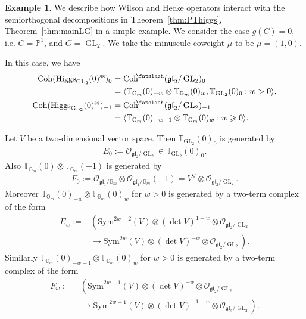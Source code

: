 \documentclass [11pt,oneside,a4paper,mathscr]{amsart}
\theoremstyle{definition}
\newtheorem{example}[thm]{Example}
\renewcommand{\geq}{\geqslant}
\newcommand{\Coh}{\operatorname{Coh}}
\newcommand{\GL}{\operatorname{GL}}
\newcommand{\shear}{{\mathbin{\mkern-6mu\fatslash}}}
\newcommand{\Hig}{\mathrm{Higgs}}
\begin{document}
\begin{example}\label{exam:Hecke}
We describe how Wilson and Hecke operators interact with the semiorthogonal decompositions in Theorem~\ref{thm:PThiggs}, Theorem~\ref{thm:mainLG} in a simple example. 
    We consider the case $g(C)=0$, i.e. $C=\mathbb{P}^1$, and $G=\GL_2$. 
    We take the minuscule coweight $\mu$ to be $\mu=(1, 0)$. 
    
    In this case, 
    we have 
\begin{align*}
    \Coh(\Hig_{\GL_2}(0)^{\mathrm{ss}})_0 &=\Coh^{\shear}(\mathfrak{gl}_2/\GL_2)_0 \\
    &=\langle \mathbb{T}_{\mathbb{G}_m}(0)_{-w}\otimes \mathbb{T}_{\mathbb{G}_m}(0)_w, \mathbb{T}_{\GL_2}(0)_0 : w>0\rangle, \\
    \Coh(\Hig_{\GL_2}(0)^{\mathrm{ss}})_{-1} &=\Coh^{\shear}(\mathfrak{gl}_2/\GL_2)_{-1} \\
    &=\langle \mathbb{T}_{\mathbb{G}_m}(0)_{-w-1}\otimes \mathbb{T}_{\mathbb{G}_m}(0)_w : w\geq 0\rangle.
\end{align*}

Let $V$ be a two-dimensional vector space. Then $\mathbb{T}_{\GL_2}(0)_0$ is generated by 
\begin{align*}E_0:=\mathcal{O}_{\mathfrak{gl}_2/\GL_2}\in \mathbb{T}_{\GL_2}(0)_0.
\end{align*}
Also 
$\mathbb{T}_{\mathbb{G}_m}(0)\otimes \mathbb{T}_{\mathbb{G}_m}(-1)$ is generated by 
\begin{align*}
F_0:=\mathcal{O}_{\mathfrak{gl}_1/\mathbb{G}_m} \otimes\mathcal{O}_{\mathfrak{gl}_1/\mathbb{G}_m}(-1) =
V^{\vee}\otimes \mathcal{O}_{\mathfrak{gl}_2/\GL_2}.
\end{align*}
Moreover 
    $ \mathbb{T}_{\mathbb{G}_m}(0)_{-w}\otimes \mathbb{T}_{\mathbb{G}_m}(0)_w$ for $w>0$ is generated by a two-term complex of the form 
    \begin{align*}
        E_w:=&\left(\mathrm{Sym}^{2w-2}(V) \otimes (\det V)^{1-w} \otimes  \mathcal{O}_{\mathfrak{gl}_2/\GL_2}\right. \\
        &\left.\to \mathrm{Sym}^{2w}(V)\otimes (\det V)^{-w} \otimes  \mathcal{O}_{\mathfrak{gl}_2/\GL_2}\right).
    \end{align*}
    Similarly $\mathbb{T}_{\mathbb{G}_m}(0)_{-w-1}\otimes \mathbb{T}_{\mathbb{G}_m}(0)_w$ for $w>0$ is generated by a two-term complex of the form 
    \begin{align*}
        F_w:=&\left(\mathrm{Sym}^{2w-1}(V)\otimes (\det V)^{-w} \otimes  \mathcal{O}_{\mathfrak{gl}_2/\GL_2} \right. \\
        &\left.\to \mathrm{Sym}^{2w+1}(V)\otimes (\det V)^{-1-w} \otimes  \mathcal{O}_{\mathfrak{gl}_2/\GL_2}\right).
    \end{align*}
    

\end{example}
\end{document}
